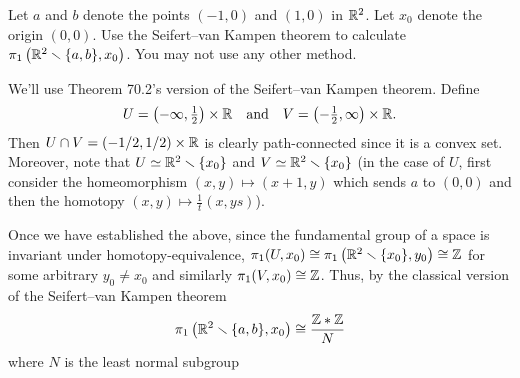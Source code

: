 \begin{problem}
Let $a$ and $b$ denote the points $(-1,0)$ and $(1,0)$ in $\mathbb{R}^2$. Let
$x_0$ denote the origin $(0,0)$. Use the Seifert--van Kampen theorem to
calculate $\pi_1\left(\mathbb{R}^2\smallsetminus\{a,b\},x_0\right)$. You may not use any other
method.
\end{problem}
\begin{solution}
We'll use Theorem 70.2's version of the Seifert--van Kampen theorem. Define
\[
U=\left(-\infty,\tfrac{1}{2}\right)\times\mathbb{R}
\quad\text{and}\quad
V=\left(-\tfrac{1}{2},\infty\right)\times\mathbb{R}.
\]
Then $U\cap V=(-1/2,1/2)\times\mathbb{R}$ is clearly path-connected since it is a
convex set. Moreover, note that $U\simeq\mathbb{R}^2\smallsetminus\{x_0\}$ and
$V\simeq\mathbb{R}^2\smallsetminus\{x_0\}$ (in the case of $U$, first consider the
homeomorphism $(x,y)\mapsto(x+1,y)$ which sends $a$ to $(0,0)$ and then the
homotopy $(x,y)\mapsto\tfrac{1}{t}(x,ys)$).

Once we have established the above, since the fundamental group of a space
is invariant under homotopy-equivalence,
$\pi_1(U,x_0)\cong\pi_1\left(\mathbb{R}^2\smallsetminus\{x_0\},y_0\right)\cong\mathbb{Z}$ for some
arbitrary $y_0\neq x_0$ and similarly $\pi_1(V,x_0)\cong\mathbb{Z}$. Thus, by the
classical version of the Seifert--van Kampen theorem
\[
\pi_1\left(\mathbb{R}^2\smallsetminus\{a,b\},x_0\right)\cong
\frac{\mathbb{Z}*\mathbb{Z}}{N}
\]
where $N$ is the least normal subgroup
\end{solution}

